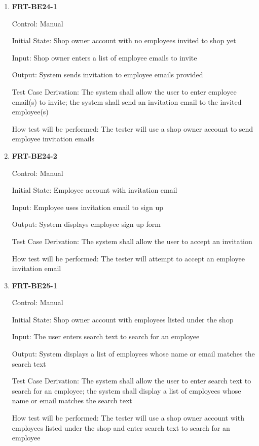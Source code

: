 \documentclass[12pt, titlepage]{article}
\begin{document}
\begin{enumerate}

	\item \textbf{FRT-BE24-1}

	      Control: Manual

	      Initial State: Shop owner account with no employees invited to shop yet

	      Input: Shop owner enters a list of employee emails to invite

	      Output: System sends invitation to employee emails provided

	      Test Case Derivation: The system shall allow the user to enter employee email(s) to invite; the
	      system shall send an invitation email to the invited employee(s)

	      How test will be performed: The tester will use a shop owner account to send employee invitation
	      emails

	\item \textbf{FRT-BE24-2}

	      Control: Manual

	      Initial State: Employee account with invitation email

	      Input: Employee uses invitation email to sign up

	      Output: System displays employee sign up form

	      Test Case Derivation: The system shall allow the user to accept an invitation

	      How test will be performed: The tester will attempt to accept an employee invitation email

	\item \textbf{FRT-BE25-1}

	      Control: Manual

	      Initial State: Shop owner account with employees listed under the shop

	      Input: The user enters search text to search for an employee

	      Output: System displays a list of employees whose name or email matches the search text

	      Test Case Derivation: The system shall allow the user to enter search text to search for an
	      employee; the system shall display a list of employees whose name or email matches the search text

	      How test will be performed: The tester will use a shop owner account with employees listed under
	      the shop and enter search text to search for an employee


\end{enumerate}
\end{document}

